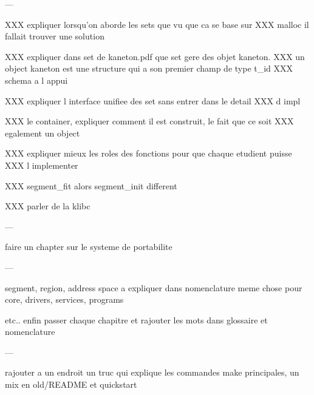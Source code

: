 ---

XXX expliquer lorsqu'on aborde les sets que vu que ca se base sur
XXX malloc il fallait trouver une solution

XXX expliquer dans set de kaneton.pdf que set gere des objet kaneton.
XXX un object kaneton est une structure qui a son premier champ de type t\_id
XXX schema a l appui

XXX expliquer l interface unifiee des set sans entrer dans le detail
XXX d impl

XXX le container, expliquer comment il est construit, le fait que ce soit
XXX egalement un object

XXX expliquer mieux les roles des fonctions pour que chaque etudient puisse
XXX l implementer

XXX segment\_fit alors segment\_init different

XXX parler de la klibc

---

faire un chapter sur le systeme de portabilite

---

segment, region, address space a expliquer dans nomenclature
meme chose pour core, drivers, services, programs

etc.. enfin passer chaque chapitre et rajouter les mots dans glossaire
et nomenclature

---

rajouter a un endroit un truc qui explique les commandes make principales,
un mix en old/README et quickstart
